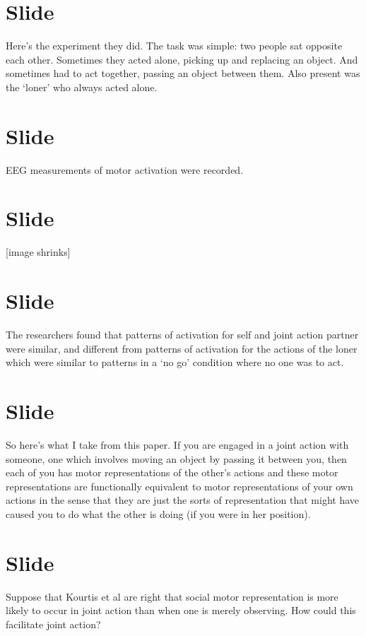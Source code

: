 \documentclass[12pt,\papersize]{extarticle}
\begin{document}
\section{Slide}
Here’s the experiment they did.
The task was simple: two people sat opposite each other.  Sometimes they acted alone, picking up and replacing an object.  And sometimes had to act together, passing an object between them.  Also present was the ‘loner’ who always acted alone.



\section{Slide}
EEG measurements of motor activation were recorded.



\section{Slide}
[image shrinks]


\section{Slide}
The researchers found that patterns of activation for self and joint action partner were similar, and different from patterns of activation for the actions of the loner which were similar to patterns in a ‘no go’ condition where no one was to act.



\section{Slide}
So here’s what I take from this paper.
If you are engaged in a joint action with someone, one which involves moving an object by passing it between you, then each of you has motor representations of the other’s actions and these motor representations are functionally equivalent to motor representations of your own actions in the sense that they are just the sorts of representation that might have caused you to do what the other is doing (if you were in her position).


\section{Slide}
Suppose that Kourtis et al are right that social motor representation is more likely to occur in joint action than when one is merely observing.
How could this facilitate joint action?
\end{document}
